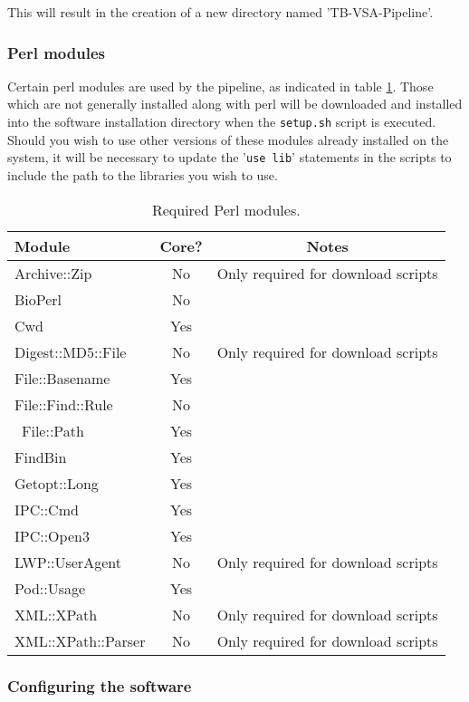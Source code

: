 \documentclass[a4paper,10pt,twoside]{article}
\begin{document}
This will result in the creation of a new directory named 'TB-VSA-Pipeline'. 

\subsubsection{Perl modules}

 Certain perl modules are used by the pipeline, as indicated in table \ref{tab:02}. 
 Those which are not generally installed along with perl will be downloaded and
installed into the software installation directory when the {\tt setup.sh} script is
executed. Should you wish to use other versions of these modules already
installed on the system, it will be necessary to update the '{\tt use lib}'
statements in the scripts to include the path to the libraries you wish to use. 

\begin{table}
\scriptsize
\begin{tabularx}{250pt}{@{}lcc@{}}\toprule
Module & Core? & Notes \\\midrule
Archive::Zip & No & Only required for download scripts \\
BioPerl & No & \\
Cwd & Yes & \\
Digest::MD5::File & No & Only required for download scripts  \\
File::Basename & Yes & \\
File::Find::Rule & No & \\\
File::Path & Yes & \\
FindBin & Yes & \\
Getopt::Long & Yes & \\
IPC::Cmd & Yes & \\
IPC::Open3 & Yes & \\
LWP::UserAgent & No & Only required for download scripts  \\
Pod::Usage & Yes & \\
XML::XPath & No & Only required for download scripts \\
XML::XPath::Parser & No & Only required for download scripts \\\hline
\end{tabularx}{}
\caption{Required Perl modules.\label{tab:02}} 
\end{table}

\subsubsection {Configuring the software}
\end{document}
